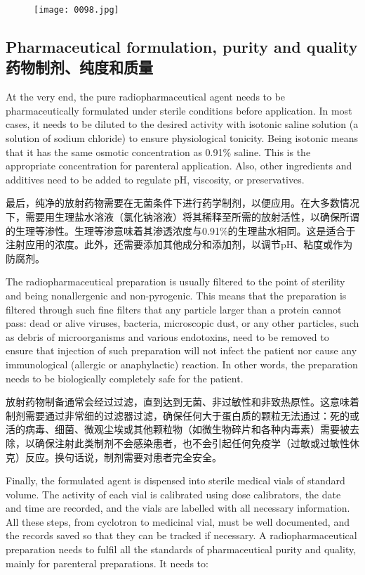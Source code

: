 \documentclass[dvipsnames, svgnames,a4paper,11pt]{article}
\begin{document}
\begin{figure}[h]
    \centering
    \texttt{[image: 0098.jpg]}
     \label{fig94}
\end{figure}

\subsection{Pharmaceutical formulation, purity and quality \\药物制剂、纯度和质量}  
At the very end, the pure radiopharmaceutical agent needs to be pharmaceutically formulated under sterile conditions before application. In most cases, it needs to be diluted to the desired activity with isotonic saline solution (a solution of sodium chloride) to ensure physiological tonicity. Being isotonic means that it has the same osmotic concentration as 0.91\% saline. This is the appropriate concentration for parenteral application. Also, other ingredients and additives need to be added to regulate pH, viscosity, or preservatives.  

最后，纯净的放射药物需要在无菌条件下进行药学制剂，以便应用。在大多数情况下，需要用生理盐水溶液（氯化钠溶液）将其稀释至所需的放射活性，以确保所谓的生理等渗性。生理等渗意味着其渗透浓度与0.91\%的生理盐水相同。这是适合于注射应用的浓度。此外，还需要添加其他成分和添加剂，以调节pH、粘度或作为防腐剂。  

The radiopharmaceutical preparation is usually filtered to the point of sterility and being nonallergenic and non-pyrogenic. This means that the preparation is filtered through such fine filters that any particle larger than a protein cannot pass: dead or alive viruses, bacteria, microscopic dust, or any other particles, such as debris of microorganisms and various endotoxins, need to be removed to ensure that injection of such preparation will not infect the patient nor cause any immunological (allergic or anaphylactic) reaction. In other words, the preparation needs to be biologically completely safe for the patient.  

放射药物制备通常会经过过滤，直到达到无菌、非过敏性和非致热原性。这意味着制剂需要通过非常细的过滤器过滤，确保任何大于蛋白质的颗粒无法通过：死的或活的病毒、细菌、微观尘埃或其他颗粒物（如微生物碎片和各种内毒素）需要被去除，以确保注射此类制剂不会感染患者，也不会引起任何免疫学（过敏或过敏性休克）反应。换句话说，制剂需要对患者完全安全。  

Finally, the formulated agent is dispensed into sterile medical vials of standard volume. The activity of each vial is calibrated using dose calibrators, the date and time are recorded, and the vials are labelled with all necessary information. All these steps, from cyclotron to medicinal vial, must be well documented, and the records saved so that they can be tracked if necessary. A radiopharmaceutical preparation needs to fulfil all the standards of pharmaceutical purity and quality, mainly for parenteral preparations. It needs to:  
\end{document}
